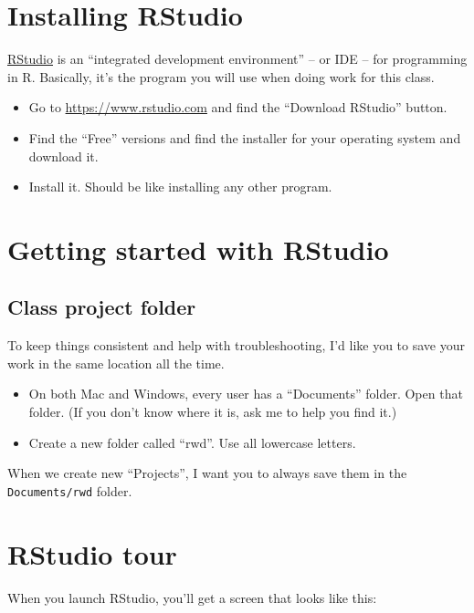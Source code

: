 \documentclass[]{book}
\providecommand{\tightlist}{%
  \setlength{\itemsep}{0pt}\setlength{\parskip}{0pt}}
\begin{document}
\section{Installing RStudio}\label{installing-rstudio}

\href{https://www.rstudio.com/}{RStudio} is an ``integrated development
environment'' -- or IDE -- for programming in R. Basically, it's the
program you will use when doing work for this class.

\begin{itemize}
\tightlist
\item
  Go to \url{https://www.rstudio.com} and find the ``Download RStudio''
  button.
\item
  Find the ``Free'' versions and find the installer for your operating
  system and download it.
\item
  Install it. Should be like installing any other program.
\end{itemize}

\section{Getting started with
RStudio}\label{getting-started-with-rstudio}

\subsection{Class project folder}\label{class-project-folder}

To keep things consistent and help with troubleshooting, I'd like you to
save your work in the same location all the time.

\begin{itemize}
\tightlist
\item
  On both Mac and Windows, every user has a ``Documents'' folder. Open
  that folder. (If you don't know where it is, ask me to help you find
  it.)
\item
  Create a new folder called ``rwd''. Use all lowercase letters.
\end{itemize}

When we create new ``Projects'', I want you to always save them in the
\texttt{Documents/rwd} folder.

\section{RStudio tour}\label{rstudio-tour}

When you launch RStudio, you'll get a screen that looks like this:
\end{document}

